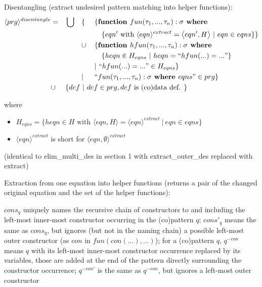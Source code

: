 \documentclass[11pt]{article} %
\begin{document}
Disentangling (extract undesired pattern matching into helper functions):
\begin{alignat*}{4}
\langle prg \rangle^{disentangle} & = &&\bigcup &&\{ ~&&\{ \textrm{\textbf{function }} fun(\tau_1, ..., \tau_n): \sigma \textrm{\textbf{ where }} \\
& && && &&\quad \{ eqn' \textrm{ with } \langle eqn \rangle^{extract} = \big\langle eqn', H \big\rangle ~ | ~ eqn \in eqns \} \} \\
& && && \cup && \{ \textrm{\textbf{function }} hfun(\tau_1, ..., \tau_n): \sigma \textrm{\textbf{ where }} \\
& && && &&\quad \{ heqn \in H_{eqns} ~ | ~ heqn = `` hfun(...) = ... " \} \\
& && && && | ~  `` hfun(...) = ... " \in H_{eqns} \} \\
& && && | && `` fun (\tau_1, ..., \tau_n): \sigma \textrm{\textbf{ where }} eqns " \in prg \} \\
& \cup && \{ def ~ | ~ def \in prg, def \textrm{ is (co)data def. } \} \span\span\span\span
\end{alignat*}

where
\begin{itemize}
\item $H_{eqns} = \{ heqn \in H \textrm{ with } \big\langle eqn, H \big\rangle = \langle eqn \rangle^{extract} ~ | ~ eqn \in eqns \}$

\item $\langle eqn \rangle^{extract}$ is short for $\langle eqn, \emptyset \rangle^{extract}$
\end{itemize}

(identical to elim\_multi\_des in section 1 with extract\_outer\_des replaced with extract)

Extraction from one equation into helper functions (returns a pair of the changed original equation and the set of the helper functions):

$cons_q$ uniquely names the recursive chain of constructors to and including the left-most inner-most constructor occurring in the (co)pattern $q$; $cons'_q$ means the same as $cons_q$, but ignores (but not in the naming chain) a possible left-most outer constructor (as $con$ in $fun(con(...), ...)$); for a (co)pattern $q$, $q^{-con}$ means $q$ with its left-most inner-most constructor occurrence replaced by its variables, those are added at the end of the pattern directly surrounding the constructor occurrence; $q^{-con'}$ is the same as $q^{-con}$, but ignores a left-most outer constructor
\end{document}
